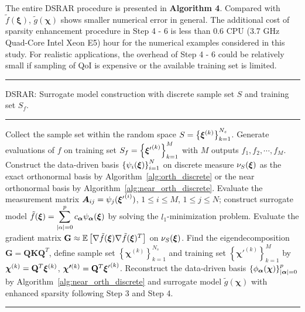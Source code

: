 The entire \ac{DSRAR} procedure is presented in \textbf{Algorithm 4}. 
Compared with $\tilde{f}(\bm\xi)$, $\tilde{g}({\bm\chi})$ shows
smaller numerical error in general. The additional cost of sparsity 
enhancement procedure in Step 4 - 6 is less than $0.6$ CPU (3.7 GHz Quad-Core 
Intel Xeon E5) hour for the numerical examples considered in this study. 
For realistic applications, the overhead of Step 4 - 6 could be 
relatively small if sampling of QoI is expensive or the available training set is limited. 

\begin{algorithm}
  \hrule
  \caption{\ac{DSRAR}: Surrogate model construction with discrete sample set $S$ and training set $S_f$.}
  \vspace{5pt} \hrule \vspace{5pt}
  \begin{algorithmic}[1]
    \State Collect the sample set within the random space $S = \left\{\bm\xi^{(k)}\right\}_{k = 1}^{N_s}$.
    \State Generate evaluations of $f$ on training set $S_f = \left\{{\bm\xi'}^{(k)}\right\}_{k = 1}^{M}$ with $M$ outputs $f_1, f_2, \cdots, f_M$.
    \State Construct the data-driven  basis $\left\{ \psi_{i}(\bm\xi)\right\}_{i = 1}^N$ on discrete measure $\nu_S(\bm\xi)$ as the exact orthonormal basis by Algorithm~\ref{alg:orth_discrete} or the near orthonormal basis by Algorithm~\ref{alg:near_orth_discrete}.
    \State Evaluate the measurement matrix ${\bm A}_{ij} = \psi_{j}({\bm\xi'}^{(i)})$, $1\le i\le M$, $1\le j \le N$; construct surrogate model $\tilde{f}(\bm\xi) = \displaystyle \sum_{\vert \alpha\vert = 0}^{p} c_{\bm \alpha} \psi_{\bm \alpha}(\bm\xi)$ by solving the $l_1$-minimization problem.
    \State Evaluate the gradient matrix $ \mathbf{G} \approx \mathbb{E}\left[\nabla \tilde{f}(\bm\xi) \nabla \tilde{f} (\bm\xi)^T \right ]$ on $\nu_{S}(\bm\xi)$.
    Find the eigendecomposition $\mathbf{G} = \mathbf{Q} \mathbf{K}\mathbf{Q}^T$, define sample set $\left\{\bm{\chi}^{(k)}\right\}_{k=1}^{N_s}$ and training set $\left\{{\bm \chi'}^{(k)}\right\}_{k=1}^{M}$ by $\bm{\chi}^{(k)} = \mathbf{Q}^T \bm\xi^{(k)}$, $\bm{\chi'}^{(k)} = \mathbf{Q}^T {\bm\xi'}^{(k)}$.
    \State Reconstruct the data-driven  basis $\left\{ \phi_{\bm\alpha}(\bm\chi)\right\}_{\vert \bm\alpha \vert = 0}^p$ by Algorithm~\ref{alg:near_orth_discrete} and surrogate model $\tilde{g}(\bm\chi)$ with enhanced sparsity following Step 3 and Step 4.
  \end{algorithmic}
  \hrule
  \label{alg:data_driven}
\end{algorithm}

